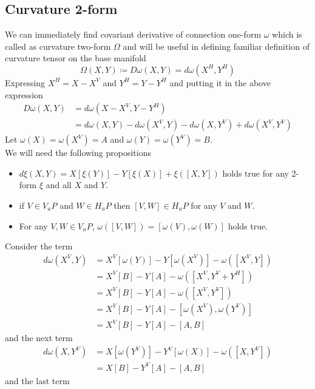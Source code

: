 \documentclass[12pt]{article}
\begin{document}
\subsection{Curvature 2-form}
We can immediately find covariant derivative of connection one-form $\omega$ which is called as curvature two-form $\Omega$ and will be useful in defining familiar definition of curvature tensor on the base manifold
\begin{equation*}
    \Omega(X, Y) \coloneqq D\omega(X, Y) = d\omega(X^{H}, Y^{H})
\end{equation*} Expressing $X^{H} = X - X^{V}$ and $Y^{H} = Y- Y^{H}$ and putting it in the above expression
\begin{align*}
    D\omega(X, Y) &= d\omega(X - X^{V}, Y - Y^{H}) \\
                  &= d\omega(X, Y) - d\omega(X^{V}, Y) - d\omega(X, Y^{V}) + d\omega(X^{V}, Y^{V})
\end{align*} Let $\omega(X) = \omega(X^{V}) = A$ and $\omega(Y) = \omega(Y^{V}) = B$. \\
We will need the following propositions
\begin{itemize}
    \item $d\xi(X, Y) = X[\xi(Y)] - Y[\xi(X)] + \xi([X, Y])$ holds true for any 2-form $\xi$ and all $X$ and $Y$.
    \item if $V\in V_{u}P$ and $W\in H_{u}P$ then $[V, W] \in H_{u}P$ for any $V$ and $W$.
    \item For any $V, W\in V_{u}P$, $\omega([V, W]) = [\omega(V), \omega(W)]$ holds true.
\end{itemize}
Consider the term
\begin{align*}
    d\omega(X^{V}, Y) &= X^{V}[\omega(Y)] - Y[\omega(X^{V})] - \omega([X^{V}, Y]) \\
                      &= X^{V}[B] - Y[A] - \omega([X^{V}, Y^{V} + Y^{H}]) \\
                      &= X^{V}[B] - Y[A] - \omega([X^{V}, Y^{V}]) \\
                      &= X^{V}[B] - Y[A] - [\omega(X^{V}), \omega(Y^{V})] \\
                      &= X^{V}[B] - Y[A] - [A, B]
\end{align*} and the next term
\begin{align*}
    d\omega(X, Y^{V}) &= X[\omega(Y^{V})] - Y^{V}[\omega(X)] - \omega([X, Y^{V}]) \\
                      &= X[B] - Y^{V}[A] - [A, B]
\end{align*} and the last term
\end{document}
